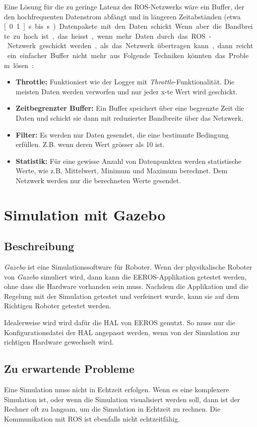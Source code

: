 Eine Lösung für die zu geringe Latenz des ROS-Netzwerks wäre ein Buffer, der den hochfrequenten Datenstrom abfängt und in längeren Zeitabständen (etwa \unit[0.1]{s} bis \unit[1]{s}) Datenpakete mit den Daten schickt.


Wenn aber die Bandbreite zu hoch ist, das heisst, wenn mehr Daten durch das ROS-Netzwerk geschickt werden, als das Netzwerk übertragen kann, dann reicht ein einfacher Buffer nicht mehr aus.
Folgende Techniken könnten das Problem lösen:
\begin{itemize}
\item \textbf{Throttle:} Funktioniert wie der Logger mit \textit{Throttle}-Funktionalität. Die meisten Daten werden verworfen und nur jeder x-te Wert wird geschickt.
\item \textbf{Zeitbegrenzter Buffer:} Ein Buffer speichert über eine begrenzte Zeit die Daten und schickt sie dann mit reduzierter Bandbreite über das Netzwerk.
\item \textbf{Filter:} Es werden nur Daten gesendet, die eine bestimmte Bedingung erfüllen. Z.B. wenn deren Wert grösser als 10 ist.
\item \textbf{Statistik:} Für eine gewisse Anzahl von Datenpunkten werden statistische Werte, wie z.B. Mittelwert, Minimum und Maximum berechnet. Dem Netzwerk werden nur die berechneten Werte gesendet.
\end{itemize}


\section{Simulation mit Gazebo}
\subsection{Beschreibung}
\textit{Gazebo} ist eine Simulationssoftware für Roboter.
Wenn der physikalische Roboter von \textit{Gazebo} simuliert wird, dann kann die EEROS-Applikation getestet werden, ohne dass die Hardware vorhanden sein muss.
Nachdem die Applikation und die Regelung mit der Simulation getestet und verfeinert wurde, kann sie auf dem Richtigen Roboter getestet werden.

Idealerweise wird wird dafür die HAL von EEROS genutzt.
So muss nur die Konfigurationsdatei der HAL angepasst werden, wenn von der Simulation zur richtigen Hardware gewechselt wird.

\subsection{Zu erwartende Probleme}
Eine Simulation muss nicht in Echtzeit erfolgen.
Wenn es eine komplexere Simulation ist, oder wenn die Simulation visualisiert werden soll, dann ist der Rechner oft zu langsam, um die Simulation in Echtzeit zu rechnen.
Die Kommunikation mit ROS ist ebenfalls nicht echtzeitfähig.


